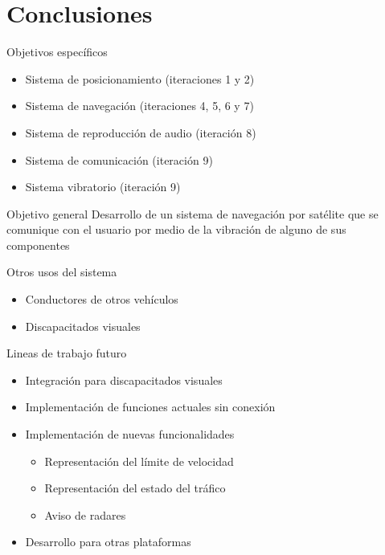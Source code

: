 \section{Conclusiones}

\begin{slide}
  \begin{block}{Objetivos específicos}
    \begin{itemize}
      \item Sistema de posicionamiento (iteraciones 1 y 2)
      \item Sistema de navegación (iteraciones 4, 5, 6 y 7)
      \item Sistema de reproducción de audio (iteración 8)
      \item Sistema de comunicación (iteración 9)
      \item Sistema vibratorio (iteración 9)
    \end{itemize}
  \end{block}
  \begin{block}{Objetivo general}
    Desarrollo de un sistema de navegación por satélite que se comunique con el usuario por medio de
    la vibración de alguno de sus componentes
  \end{block}
\end{slide}

\begin{slide}
  \begin{block}{Otros usos del sistema}
    \begin{itemize}
      \item Conductores de otros vehículos
      \item Discapacitados visuales
    \end{itemize}
  \end{block}

  \begin{block}{Lineas de trabajo futuro}
    \begin{itemize}
      \item Integración para discapacitados visuales
      \item Implementación de funciones actuales sin conexión
      \item Implementación de nuevas funcionalidades
        \begin{itemize}
          \item Representación del límite de velocidad
          \item Representación del estado del tráfico
          \item Aviso de radares
        \end{itemize}
      \item Desarrollo para otras plataformas
    \end{itemize}
  \end{block}
\end{slide}

